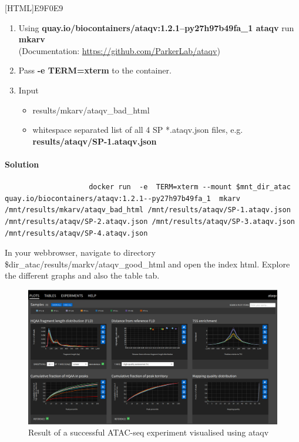 \documentclass[12pt]{article}
\begin{document}
			[HTML]{E9F0E9}{\parbox{\linewidth}{%
					\begin{enumerate}
						\item  Using \textbf{quay.io/biocontainers/ataqv:1.2.1--py27h97b49fa\_1 ataqv} run \textbf{mkarv}\\
						(Documentation: \url{https://github.com/ParkerLab/ataqv})
						\item  Pass \textbf{-e TERM=xterm} to the container.
						\item Input
						\begin{itemize}
							\item results/mkarv/ataqv\_bad\_html 
							\item whitespace separated list of all 4 SP *.ataqv.json files, e.g.  \textbf{results/ataqv/SP-1.ataqv.json}  
						\end{itemize}
					\end{enumerate}
			}}
			
			\paragraph{Solution}	
			
			\begin{minipage}{\linewidth}
				\begin{lstlisting}
					docker run  -e  TERM=xterm --mount $mnt_dir_atac quay.io/biocontainers/ataqv:1.2.1--py27h97b49fa_1  mkarv /mnt/results/mkarv/ataqv_bad_html /mnt/results/ataqv/SP-1.ataqv.json /mnt/results/ataqv/SP-2.ataqv.json /mnt/results/ataqv/SP-3.ataqv.json /mnt/results/ataqv/SP-4.ataqv.json
				\end{lstlisting}
			\end{minipage}
			
			In your webbrowser, navigate to directory \$dir\_atac/results/markv/ataqv\_good\_html  and  open the index html. 
			Explore the different graphs and also the table tab.
			
			\begin{figure}[H]
				\includegraphics[width=\textwidth]{ataqv_good.png}
				\caption{Result of a successful  ATAC-seq experiment visualised using ataqv}
				\label{fig:ataqv_good}
			\end{figure}
			
\end{document}
